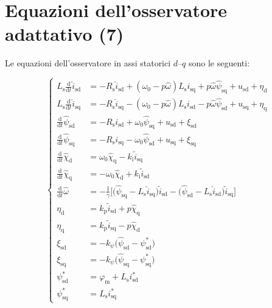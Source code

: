 \documentclass[11pt, a4paper]{scrartcl}
\numberwithin{equation}{section}
\begin{document}
\section*{Equazioni dell'osservatore adattativo (7)}

Le equazioni dell'osservatore in assi statorici $d$--$q$ sono le seguenti:

\begin{equation}
	\label{nlobs_1}\left\lbrace 
	\begin{aligned}
		L_\text{s} \frac{\text{d}}{\text{d}t}\hat{i}_\text{sd} &= -R_\text{s} \hat{i}_\text{sd}+\left( \omega_0-p\hat{\omega}\right)L_\text{s}i_\text{sq} + 
		p \hat{\omega}\hat{\psi}_\text{sq}+u_\text{sd}+\eta_\text{d} \\[6pt]
		L_\text{s} \frac{\text{d}}{\text{d}t}\hat{i}_\text{sq} &= -R_\text{s} \hat{i}_\text{sq}-\left( \omega_0-p\hat{\omega}\right)L_\text{s}i_\text{sd} - 
		p \hat{\omega}\hat{\psi}_\text{sd}+u_\text{sq}+\eta_\text{q} \\[6pt]
		\frac{\text{d}}{\text{d}t}\hat{\psi}_\text{sd} &= -R_\text{s} i_\text{sd} + \omega_0\hat{\psi}_\text{sq} + u_\text{sd} + \xi_\text{sd}  \\[6pt]
		\frac{\text{d}}{\text{d}t}\hat{\psi}_\text{sq} &= -R_\text{s} i_\text{sq} - \omega_0\hat{\psi}_\text{sd} + u_\text{sq} + \xi_\text{sq}  \\[6pt]
		\frac{\text{d}}{\text{d}t}\hat{\chi}_\text{d} &= \omega_0\hat{\chi}_\text{q} - k_\text{i}\tilde{i}_\text{sq}  \\[6pt]
		\frac{\text{d}}{\text{d}t}\hat{\chi}_\text{q} &= -\omega_0\hat{\chi}_\text{d} + k_\text{i}\tilde{i}_\text{sd}  \\[6pt]
		\frac{\text{d}}{\text{d}t}\hat{\omega} &= -\frac{1}{\gamma}\big[\big(\hat{\psi}_\text{sq} -L_\text{s}\hat{i}_\text{sq}\big)\tilde{i}_\text{sd} - \big(\hat{\psi}_\text{sd} -L_\text{s}\hat{i}_\text{sd}\big)\tilde{i}_\text{sq}\big]  \\[6pt]
		\eta_\text{d} &= k_\text{p}\tilde{i}_\text{sd} + p\hat{\chi}_\text{q} \\[6pt]
		\eta_\text{q} &= k_\text{p}\tilde{i}_\text{sq} - p\hat{\chi}_\text{d} \\[6pt]
		\xi_\text{sd} &= -k_{\psi}\big(\hat{\psi}_\text{sd} - \psi_\text{sd}^\text{*}\big) \\[6pt]
		\xi_\text{sq} &= -k_{\psi}\big(\hat{\psi}_\text{sq} - \psi_\text{sq}^\text{*}\big) \\[6pt]
		\psi_\text{sd}^\text{*} &= \varphi_\text{m} + L_\text{s}i_\text{sd}^\text{*} \\[6pt]
		\psi_\text{sq}^\text{*} &= L_\text{s}i_\text{sq}^\text{*}
	\end{aligned}\right. 
\end{equation}
\end{document}
